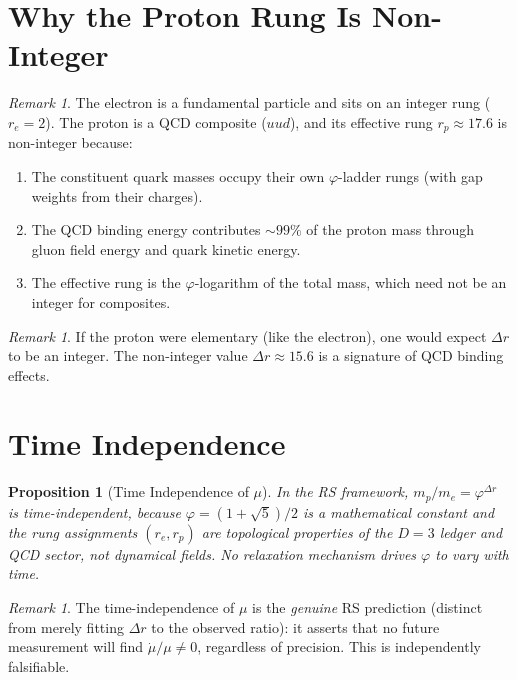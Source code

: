 \documentclass[12pt,a4paper]{article}
\newtheorem{proposition}[theorem]{Proposition}
\theoremstyle{definition}
\theoremstyle{remark}
\newtheorem{remark}[theorem]{Remark}
\begin{document}
\section{Why the Proton Rung Is Non-Integer}
\label{sec:composite}

\begin{remark}
The electron is a fundamental particle and sits on an integer
rung ($r_e = 2$).  The proton is a QCD composite ($uud$), and
its effective rung $r_p \approx 17.6$ is non-integer because:
\begin{enumerate}[label=(\roman*)]
  \item The constituent quark masses occupy their own
  $\varphi$-ladder rungs (with gap weights from their charges).
  \item The QCD binding energy contributes $\sim 99\%$ of the
  proton mass through gluon field energy and quark kinetic energy.
  \item The effective rung is the $\varphi$-logarithm of the
  total mass, which need not be an integer for composites.
\end{enumerate}
\end{remark}

\begin{remark}
If the proton were elementary (like the electron), one would
expect $\Delta r$ to be an integer.  The non-integer value
$\Delta r \approx 15.6$ is a signature of QCD binding effects.
\end{remark}

\section{Time Independence}
\label{sec:time}

\begin{proposition}[Time Independence of $\mu$]
\label{prop:constant-mu}
In the RS framework, $m_p/m_e = \varphi^{\Delta r}$ is
time-independent, because $\varphi = (1+\sqrt{5})/2$ is a mathematical
constant and the rung assignments $(r_e, r_p)$ are topological
properties of the $D = 3$ ledger and QCD sector, not dynamical
fields.  No relaxation mechanism drives $\varphi$ to vary with time.
\end{proposition}

\begin{remark}
The time-independence of $\mu$ is the \emph{genuine} RS prediction
(distinct from merely fitting $\Delta r$ to the observed ratio):
it asserts that no future measurement will find $\dot{\mu}/\mu \neq 0$,
regardless of precision.  This is independently falsifiable.
\end{remark}
\end{document}
